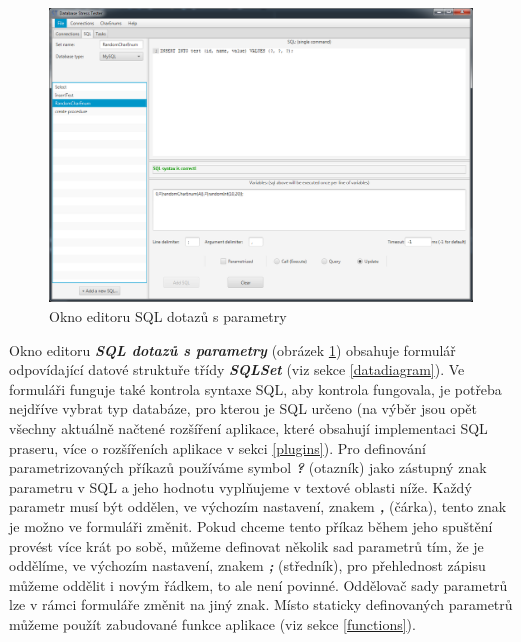 \documentclass[czech,bachelor,public,dept460,male,cpdeclaration,twoside]{diploma}
\begin{document}
\newpage
\begin{figure}[!htbp]\centering\includegraphics[width=1.0\textwidth]{Figures/sqleditor.png}\caption{Okno editoru SQL dotazů s parametry}
\label{sqleditor}
\end{figure}
Okno editoru \textbf{\emph{SQL dotazů s parametry}} (obrázek \ref{sqleditor}) obsahuje formulář odpovídající datové struktuře třídy \textbf{\emph{SQLSet}} (viz sekce \ref{datadiagram}). Ve formuláři funguje také kontrola syntaxe SQL, aby kontrola fungovala, je potřeba nejdříve vybrat typ databáze, pro kterou je SQL určeno (na výběr jsou opět všechny aktuálně načtené rozšíření aplikace, které obsahují implementaci SQL praseru, více o rozšířeních aplikace v sekci \ref{plugins}). Pro definování parametrizovaných příkazů používáme symbol \textbf{\emph{?}} (otazník) jako zástupný znak parametru v SQL a jeho hodnotu vyplňujeme v textové oblasti níže. Každý parametr musí být oddělen, ve výchozím nastavení, znakem \textbf{\emph{,}} (čárka), tento znak je možno ve formuláři změnit. Pokud chceme tento příkaz během jeho spuštění provést více krát po sobě, můžeme definovat několik sad parametrů tím, že je oddělíme, ve výchozím nastavení, znakem \textbf{\emph{;}} (středník), pro přehlednost zápisu můžeme oddělit i novým řádkem, to ale není povinné. Oddělovač sady parametrů lze v rámci formuláře změnit na jiný znak. Místo staticky definovaných parametrů můžeme použít zabudované funkce aplikace (viz sekce \ref{functions}).
\end{document}
